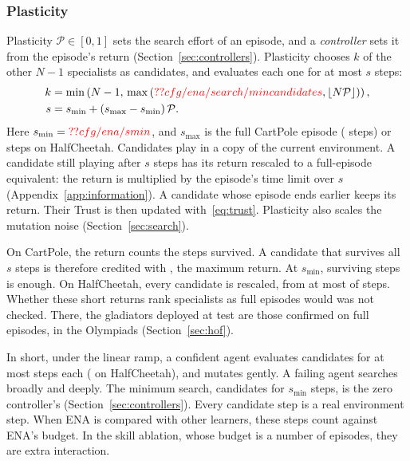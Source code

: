 \subsubsection{Plasticity}
Plasticity $\mathcal{P} \in [0, 1]$ sets the search effort of an episode, and a \textit{controller} sets it from the episode's return (Section~\ref{sec:controllers}). Plasticity chooses $k$ of the other $N-1$ specialists as candidates, and evaluates each one for at most $s$ steps:
\begin{equation}
\begin{split}
k &= \min\left(N-1,\, \max\left(\Res{cfg/ena/search/mincandidates}, \lfloor N\mathcal{P} \rfloor\right)\right), \\
s &= s_{\min} + (s_{\max} - s_{\min})\,\mathcal{P}.
\end{split}
\label{eq:plasticity}
\end{equation}
Here $s_{\min} = \Res{cfg/ena/smin}$, and $s_{\max}$ is the full CartPole episode ( steps) or  steps on HalfCheetah. Candidates play in a copy of the current environment. A candidate still playing after $s$ steps has its return rescaled to a full-episode equivalent: the return is multiplied by the episode's time limit over $s$ (Appendix~\ref{app:information}). A candidate whose episode ends earlier keeps its return. Their Trust is then updated with~\eqref{eq:trust}. Plasticity also scales the mutation noise (Section~\ref{sec:search}).

On CartPole, the return counts the steps survived. A candidate that survives all $s$ steps is therefore credited with , the maximum return. At $s_{\min}$, surviving  steps is enough. On HalfCheetah, every candidate is rescaled, from at most  of  steps. Whether these short returns rank specialists as full episodes would was not checked. There, the gladiators deployed at test are those confirmed on full episodes, in the Olympiads (Section~\ref{sec:hof}).

In short, under the linear ramp, a confident agent evaluates  candidates for at most  steps each ( on HalfCheetah), and mutates gently. A failing agent searches broadly and deeply. The minimum search,  candidates for $s_{\min}$ steps, is the zero controller's (Section~\ref{sec:controllers}). Every candidate step is a real environment step. When ENA is compared with other learners, these steps count against ENA's budget. In the skill ablation, whose budget is a number of episodes, they are extra interaction.

